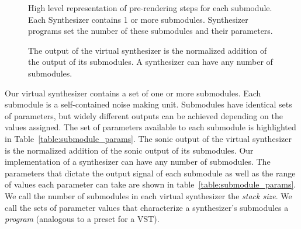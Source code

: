 \documentclass[\main/thesis.tex]{subfiles}
\begin{document}
 \begin{figure}[htbp]
    \begin{center}
    \end{center}
    \caption{High level representation of pre-rendering steps for each submodule. Each Synthesizer contains 1 or more submodules. Synthesizer programs set the number of these submodules and their parameters.
    }
\label{fig:submodule}
\end{figure}

 \begin{figure}[htbp]
    \begin{center}
    \end{center}
    \caption{The output of the virtual synthesizer is the normalized addition of the output of its submodules. A synthesizer can have any number of submodules. 
    }
\label{fig:synth_modules}
\end{figure}
Our virtual synthesizer contains a set of one or more submodules. Each submodule is a self-contained noise making unit. Submodules have identical sets of parameters, but widely different outputs can be achieved depending on the values assigned. The set of parameters available to each submodule is highlighted in Table~\ref{table:submodule_params}. The sonic output of the virtual synthesizer is the normalized addition of the sonic output of its submodules. Our implementation of a synthesizer can have any number of submodules. The parameters that dictate the output signal of each submodule as well as the range of values each parameter can take are shown in table~\ref{table:submodule_params}. We call the number of submodules in each virtual synthesizer the \textit{stack size}. We call the sets of parameter values that characterize a synthesizer's submodules a \textit{program} (analogous to a preset for a VST).  
\end{document}
